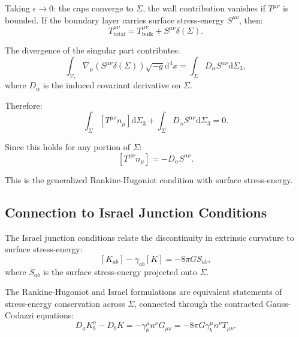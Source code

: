 \documentclass[11pt,a4paper]{article}
\newcommand{\dx}{\mathrm{d}}
\theoremstyle{definition}
\begin{document}
Taking $\epsilon \to 0$: the caps converge to $\Sigma$, the wall contribution vanishes if $T^{\mu\nu}$ is bounded. If the boundary layer carries surface stress-energy $S^{\mu\nu}$, then:
\begin{equation}
T^{\mu\nu}_{\text{total}} = T^{\mu\nu}_{\text{bulk}} + S^{\mu\nu} \delta(\Sigma).
\end{equation}

The divergence of the singular part contributes:
\begin{equation}
\int_{\mathcal{V}_\epsilon} \nabla_\mu (S^{\mu\nu} \delta(\Sigma)) \sqrt{-g} \dx^4 x = \int_\Sigma D_\alpha S^{\alpha\nu} \dx \Sigma_3,
\end{equation}
where $D_\alpha$ is the induced covariant derivative on $\Sigma$.

Therefore:
\begin{equation}
\int_\Sigma [T^{\mu\nu} n_\mu] \dx \Sigma_3 + \int_\Sigma D_\alpha S^{\alpha\nu} \dx \Sigma_3 = 0.
\end{equation}

Since this holds for any portion of $\Sigma$:
\begin{equation}
\label{eq:RH_local_app}
\boxed{[T^{\mu\nu} n_\mu] = -D_\alpha S^{\alpha\nu}.}
\end{equation}

This is the generalized Rankine-Hugoniot condition with surface stress-energy.

\subsection{Connection to Israel Junction Conditions}
\label{app:Israel_connection}

The Israel junction conditions relate the discontinuity in extrinsic curvature to surface stress-energy:
\begin{equation}
\label{eq:Israel_junction_app}
\boxed{[K_{ab}] - \gamma_{ab} [K] = -8\pi G S_{ab},}
\end{equation}
where $S_{ab}$ is the surface stress-energy projected onto $\Sigma$.

The Rankine-Hugoniot and Israel formulations are equivalent statements of stress-energy conservation across $\Sigma$, connected through the contracted Gauss-Codazzi equations:
\begin{equation}
D_a K^a_b - D_b K = -\gamma^\mu_b n^\nu G_{\mu\nu} = -8\pi G \gamma^\mu_b n^\nu T_{\mu\nu}.
\end{equation}
\end{document}
